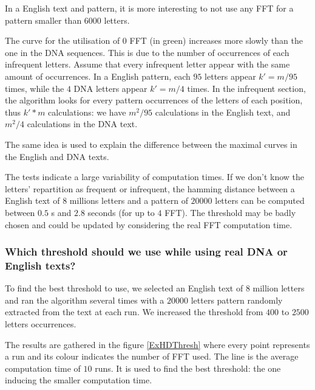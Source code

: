 \documentclass[preprint,12pt]{elsarticle}
\begin{document}
In a English text and pattern, it is more interesting to not use any FFT for a pattern smaller than $6000$ letters.

The curve for the utilisation of $0$ FFT (in green) increases more slowly than the one in the DNA sequences.
This is due to the number of occurrences of each infrequent letters.
Assume that every infrequent letter appear with the same amount of occurrences.
In a English pattern, each $95$ letters appear $k'=m/95$ times,
while the $4$ DNA letters appear $k'=m/4$ times.
In the infrequent section, the algorithm looks for every pattern occurrences of the letters of each position,
thus $k'*m$ calculations:
we have $m^2/95$ calculations in the English text,
and $m^2/4$ calculations in the DNA text. 

The same idea is used to explain the difference between the maximal curves in the English and DNA texts.


The tests indicate a large variability of computation times.
If we don't know the letters' repartition as frequent or infrequent,
the hamming distance between a English text of $8$ millions letters
and a pattern of $20 000$ letters can be computed between $0.5$ s and $2.8$ seconds
(for up to $4$ FFT).
The threshold may be badly chosen and could be updated by considering the real FFT computation time.




\subsubsection*{Which threshold should we use while using real DNA or English texts?}

To find the best threshold to use,
we selected an English text of $8$ million letters
and ran the algorithm several times
with a $20 000$ letters pattern
randomly extracted from the text at each run.
We increased the threshold from $400$ to $2500$ letters occurrences.%

The results are gathered in the figure \ref{ExHDThresh} where
every point represents a run and its colour indicates the number of FFT used.
The line is the average computation time of $10$ runs.
It is used to find the best threshold:
the one inducing the smaller computation time.
\end{document}
